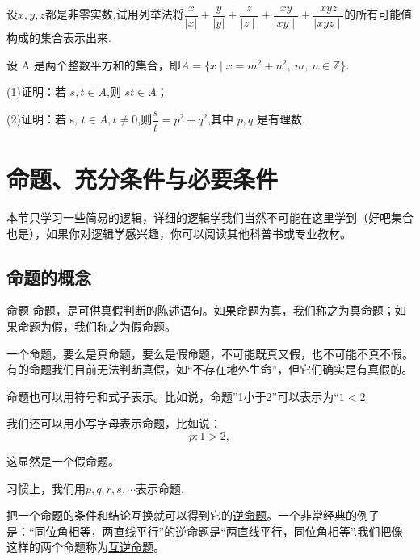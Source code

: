 \documentclass[lang=cn,math=cm,chinesefont=nofont,11pt,scheme=chinese,twocol]{elegantbook}
\begin{document}
\begin{exercise}\label{exer:17}
  设$x,y,z$都是非零实数,试用列举法将$\dfrac x{|x|}+\dfrac y{|y|}+{\dfrac{z}{\mid z\mid}}+{\dfrac{xy}{\mid xy\mid}}+{\dfrac{xyz}{\mid xyz\mid}}$的所有可能值构成的集合表示出来.
\end{exercise}

\begin{exercise}\label{exer:18}
  设 A 是两个整数平方和的集合，即$A=\{x\mid x=m^2+n^2,\:m,\:n\in\mathbb{Z}\}.$

(1)证明：若 $s,t{\in}A$,则 $st{\in}A$；

(2)证明：若 s, $t\in A,t\neq0$,则$\dfrac st=p^2+q^2$,其中 $p,q$ 是有理数.
\end{exercise}

\section{命题、充分条件与必要条件}
本节只学习一些简易的逻辑，详细的逻辑学我们当然不可能在这里学到（好吧集合也是），如果你对逻辑学感兴趣，你可以阅读其他科普书或专业教材。

\subsection{命题的概念}

\begin{definition}{命题}
  \underline{命题}，是可供真假判断的陈述语句。如果命题为真，我们称之为\underline{真命题}；如果命题为假，我们称之为\underline{假命题}。
\end{definition}

\begin{remark}
  一个命题，要么是真命题，要么是假命题，不可能既真又假，也不可能不真不假。有的命题我们目前无法判断真假，如“不存在地外生命”，但它们确实是有真假的。
\end{remark}

命题也可以用符号和式子表示。比如说，命题”1小于2”可以表示为“$1<2$.

我们还可以用小写字母表示命题，比如说：$$p:1>2,$$

这显然是一个假命题。

习惯上，我们用$p,q,r,s,\cdots$表示命题.

\hspace*{\fill}

把一个命题的条件和结论互换就可以得到它的\underline{逆命题}。一个非常经典的例子是：“同位角相等，两直线平行”的逆命题是“两直线平行，同位角相等”.我们把像这样的两个命题称为\underline{互逆命题}。
\end{document}
